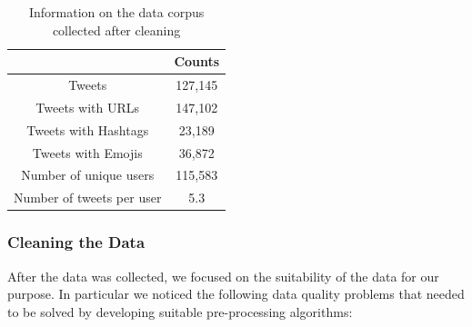 \documentclass[10pt,letterpaper]{article}
\begin{document}
\begin{table}[h!]
\centering
\begin{tabular}{| c | c |} 
\hline
& Counts \\
\hline
Tweets & 127,145\\ 
 Tweets with URLs & 147,102  \\
 Tweets with Hashtags & 23,189 \\
 Tweets with Emojis & 36,872 \\
 Number of unique users & 115,583 \\
 Number of tweets per user & 5.3 \\
 \hline
\end{tabular}
\caption{Information on the data corpus collected after cleaning}
\label{table:afterclean}
\end{table}

\subsubsection{Cleaning the Data}
After the data was collected, we focused on the suitability of the data for our purpose. In particular we noticed the following data quality problems that needed to be solved by developing suitable pre-processing algorithms:  
\end{document}
